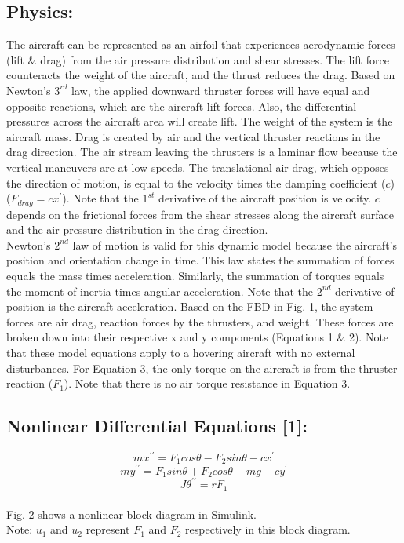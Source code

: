 \documentclass[conference]{IEEEtran}
\begin{document}
\subsection{Physics:}
The aircraft can be represented as an airfoil that experiences aerodynamic forces (lift \& drag) from the air pressure distribution and shear stresses. The lift force counteracts the weight of the aircraft, and the thrust reduces the drag. Based on Newton’s $3^{rd}$ law, the applied downward thruster forces will have equal and opposite reactions, which are the aircraft lift forces. Also, the differential pressures across the aircraft area will create lift. The weight of the system is the aircraft mass. Drag is created by air and the vertical thruster reactions in the drag direction. The air stream leaving the thrusters is a laminar flow because the vertical maneuvers are at low speeds. The translational air drag, which opposes the direction of motion, is equal to the velocity times the damping coefficient ($c$) 
 ($F_{drag} = cx^\prime$). Note that the $1^{st}$ derivative of the aircraft position is velocity. $c$ depends on the frictional forces from the shear stresses along the aircraft surface and the air pressure distribution in the drag direction.\\

Newton's $2^{nd}$ law of motion is valid for this dynamic model because the aircraft's position and orientation change in time. This law states the summation of forces equals the mass times acceleration. Similarly, the summation of torques equals the moment of inertia times angular acceleration. Note that the $2^{nd}$ derivative of position is the aircraft acceleration. Based on the FBD in Fig. 1, the system forces are air drag, reaction forces by the thrusters, and weight. These forces are broken down into their respective x and y components (Equations 1 \& 2). Note that these model equations apply to a hovering aircraft with no external disturbances. For Equation 3, the only torque on the aircraft is from the thruster reaction ($F_1$). Note that there is no air torque resistance in Equation 3.

\subsection{Nonlinear Differential Equations [1]:} 
\[
mx^{\prime\prime} = F_1cos\theta - F_2sin\theta - cx^{\prime}  \tag{1}
\] 
\[
my^{\prime\prime} = F_1sin \theta + F_2cos\theta - mg - cy^\prime \tag{2}
\]
\[
J\theta^{\prime\prime} = rF_1 \tag{3} 
\]\\
Fig. 2 shows a nonlinear block diagram in Simulink. \\
Note: $u_1$ and $u_2$ represent $F_1$ and $F_2$ respectively in this block diagram. \\
\end{document}
